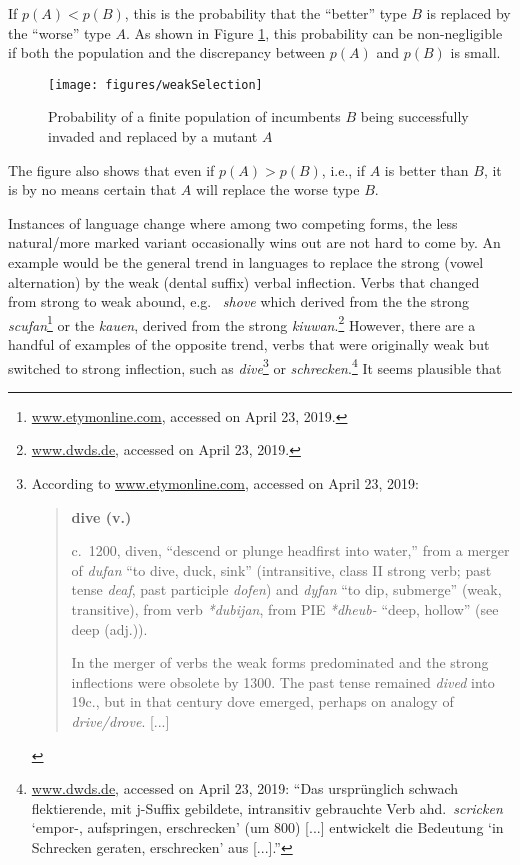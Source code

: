 \documentclass[output=paper,hidelinks]{langscibook}
\begin{document}
If $p(A) < p(B)$, this is the probability that the ``better'' type $B$ is replaced by the
``worse'' type $A$. As shown in Figure \ref{fig:5}, this probability can be non-negligible
if both the population and the discrepancy between $p(A)$ and $p(B)$ is small.

\begin{figure}
  \texttt{[image: figures/weakSelection]}
  \caption{Probability of a finite population of incumbents $B$ being successfully invaded
    and replaced by a mutant $A$}
  \label{fig:5}
\end{figure}

The figure also shows that even if $p(A) > p(B)$, i.e., if $A$ is better than $B$, it is
by no means certain that $A$ will replace the worse type $B$.

Instances of language change where among two competing forms, the less natural/more marked
variant occasionally wins out are not hard to come by. An example would be the general
trend in  languages to replace the strong (vowel alternation) by the weak (dental
suffix) verbal inflection. Verbs that changed from strong to weak abound, e.g.\ 
\emph{shove} which derived from the the strong 
\emph{scufan}\footnote{\url{www.etymonline.com}, accessed on April 23, 2019.} or the
 \emph{kauen}, derived from the strong 
\emph{kiuwan}.\footnote{\url{www.dwds.de}, accessed on April 23, 2019.} However, there are
a handful of examples of the opposite trend, verbs that were originally weak but switched
to strong inflection, such as  \emph{dive}\footnote{%
  According to \url{www.etymonline.com}, accessed on April 23, 2019:
  \begin{quotation}
    \textbf{dive (v.)}
    
    c.\ 1200, diven, ``descend or plunge headfirst into water,'' from a merger of  \emph{dufan} ``to dive, duck, sink'' (intransitive, class II strong verb; past
    tense \emph{deaf}, past participle \emph{dofen}) and \emph{dyfan} ``to dip, submerge''
    (weak, transitive), from  verb \emph{*dubijan}, from PIE \emph{*dheub-}
    ``deep, hollow'' (see deep (adj.)).

    In the merger of verbs the weak forms predominated and the strong inflections were
    obsolete by 1300. The past tense remained \emph{dived} into 19c., but in that century
    dove emerged, perhaps on analogy of \emph{drive/drove}.  [...]
  \end{quotation}} or  \emph{schrecken}.\footnote{\url{www.dwds.de}, accessed on April 23, 2019:
  ``Das ursprünglich schwach flektierende, mit j-Suffix gebildete, intransitiv gebrauchte
  Verb ahd.\ \emph{scricken} `empor-, aufspringen, erschrecken' (um 800) [...] entwickelt
  die Bedeutung `in Schrecken geraten, erschrecken' aus [...].''} It seems plausible that
\end{document}
